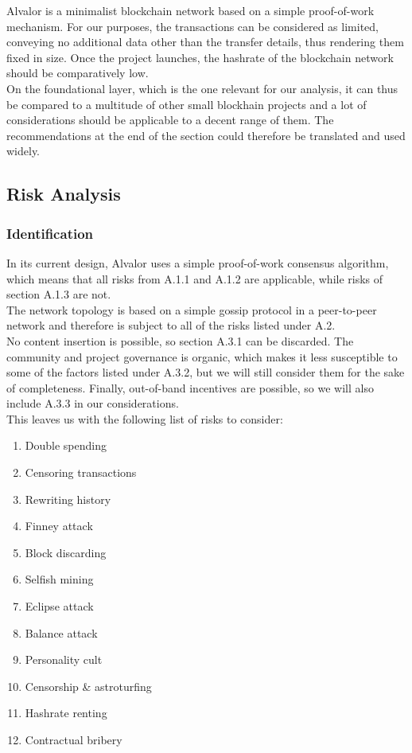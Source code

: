 \documentclass[12pt,a4paper]{article}
\begin{document}
Alvalor is a minimalist blockchain network based on a simple proof-of-work mechanism. For our purposes, the transactions can be considered as limited, conveying no additional data other than the transfer details, thus rendering them fixed in size. Once the project launches, the hashrate of the blockchain network should be comparatively low.\\

On the foundational layer, which is the one relevant for our analysis, it can thus be compared to a multitude of other small blockhain projects and a lot of considerations should be applicable to a decent range of them. The recommendations at the end of the section could therefore be translated and used widely.\\

\subsection{Risk Analysis}

\subsubsection{Identification}

In its current design, Alvalor uses a simple proof-of-work consensus algorithm, which means that all risks from A.1.1 and A.1.2 are applicable, while risks of section A.1.3 are not.\\

The network topology is based on a simple gossip protocol in a peer-to-peer network and therefore is subject to all of the risks listed under A.2.\\

No content insertion is possible, so section A.3.1 can be discarded. The community and project governance is organic, which makes it less susceptible to some of the factors listed under A.3.2, but we will still consider them for the sake of completeness. Finally, out-of-band incentives are possible, so we will also include A.3.3 in our considerations.\\

This leaves us with the following list of risks to consider:
\begin{enumerate}
  \item Double spending
  \item Censoring transactions
  \item Rewriting history
  \item Finney attack
  \item Block discarding
  \item Selfish mining
  \item Eclipse attack
  \item Balance attack
  \item Personality cult
  \item Censorship \& astroturfing
  \item Hashrate renting
  \item Contractual bribery
\end{enumerate}
\end{document}
